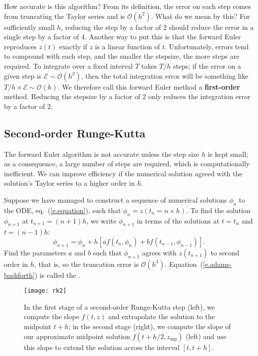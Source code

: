 How accurate is this  algorithm? From its definition, the error on each step comes from truncating the Taylor series and is $\mathcal{O}(h^{2})$. What do we mean by this? For sufficiently small $h$, reducing the step by a factor of 2 should reduce the error in a single step by a factor of 4. Another way to put this is that the forward Euler reproduces $z(t)$ exactly if $z$ is a linear function of $t$.
Unfortunately, errors tend to compound with each step, and the smaller the stepsize, the more steps are required. To integrate over a fixed interval $T$ takes $T/h$ steps; if the error on a given step is $\mathcal{E}\sim \mathcal{O}(h^{2})$, then the total integration error will be something like $T/h \times \mathcal{E} \sim \mathcal{O}(h)$.  We therefore call this forward Euler method a \textbf{first-order} method. Reducing the stepsize by a factor of 2 only reduces the integration error by a factor of 2.

\subsection{Second-order Runge-Kutta}

The forward Euler algorithm is not accurate unless the step size $h$ is kept small; as a consequence, a large number of steps are required, which is computationally inefficient. We can improve efficiency if the numerical solution agreed with the solution's Taylor series to a higher order in $h$.
\begin{exercisebox}
Suppose we have managed to construct a sequence of numerical solutions $\phi_{n}$ to the ODE, eq.~(\ref{e.equation}), such that $\phi_{n} = z(t_{n}=n\times h)$. To find the solution $\phi_{n+1}$ at $t_{n+1}=(n+1)h$, we write $\phi_{n+1}$ in terms of the solutions at $t = t_{n}$ and $t=(n-1)h$:
\begin{equation}\label{e.adams-bashforth}
\phi_{n+1} = \phi_{n} + h\left[af(t_{n},\phi_{n}) + bf(t_{n-1},\phi_{n-1})\right].
\end{equation}
Find the parameters $a$ and $b$ such that $\phi_{n+1}$ agrees with $z(t_{n+1})$ to second order in $h$, that is, so the truncation error is $\mathcal{O}(h^{3})$. Equation~(\ref{e.adams-bashforth}) is called the .
\end{exercisebox}

\begin{figure}
\texttt{[image: rk2]}
\caption[The second-order Runge-Kutta method]{\label{f.rk2}
In the first stage of a second-order Runge-Kutta step (left), we compute the slope $f(t,z)$ and extrapolate the solution to the midpoint $t+h$; in the second stage (right), we compute the slope of our approximate midpoint solution $f(t+h/2,z_{\mathrm{mp}})$ (left) and use this slope to extend the solution across the interval $[t,t+h]$.}
\end{figure}

